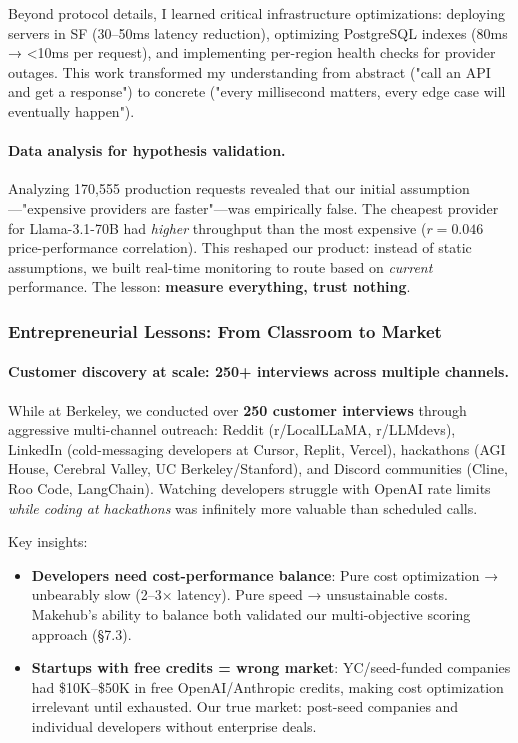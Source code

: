 \documentclass[english]{article}
\begin{document}
Beyond protocol details, I learned critical infrastructure optimizations: deploying servers in SF (30--50ms latency reduction), optimizing PostgreSQL indexes (80ms → <10ms per request), and implementing per-region health checks for provider outages. This work transformed my understanding from abstract ("call an API and get a response") to concrete ("every millisecond matters, every edge case will eventually happen").

\paragraph{Data analysis for hypothesis validation.}

Analyzing 170,555 production requests revealed that our initial assumption—"expensive providers are faster"—was empirically false. The cheapest provider for Llama-3.1-70B had \emph{higher} throughput than the most expensive ($r = 0.046$ price-performance correlation). This reshaped our product: instead of static assumptions, we built real-time monitoring to route based on \emph{current} performance. The lesson: \textbf{measure everything, trust nothing}.

\subsubsection{Entrepreneurial Lessons: From Classroom to Market}

\paragraph{Customer discovery at scale: 250+ interviews across multiple channels.}

While at Berkeley, we conducted over \textbf{250 customer interviews} through aggressive multi-channel outreach: Reddit (r/LocalLLaMA, r/LLMdevs), LinkedIn (cold-messaging developers at Cursor, Replit, Vercel), hackathons (AGI House, Cerebral Valley, UC Berkeley/Stanford), and Discord communities (Cline, Roo Code, LangChain). Watching developers struggle with OpenAI rate limits \emph{while coding at hackathons} was infinitely more valuable than scheduled calls.

Key insights:
\begin{itemize}
    \item \textbf{Developers need cost-performance balance}: Pure cost optimization → unbearably slow (2--3× latency). Pure speed → unsustainable costs. Makehub's ability to balance both validated our multi-objective scoring approach (§7.3).

    \item \textbf{Startups with free credits = wrong market}: YC/seed-funded companies had \$10K--\$50K in free OpenAI/Anthropic credits, making cost optimization irrelevant until exhausted. Our true market: post-seed companies and individual developers without enterprise deals.
\end{itemize}
\end{document}
